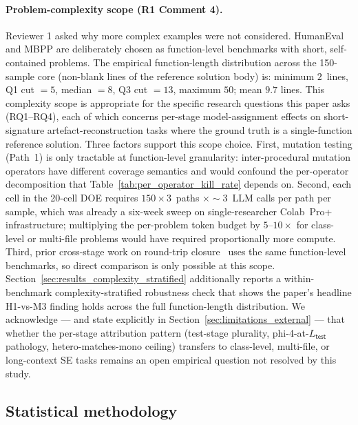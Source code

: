 \paragraph{Problem-complexity scope (R1 Comment 4).}
Reviewer 1 asked why more complex examples were not considered. HumanEval and MBPP are deliberately chosen as function-level benchmarks with short, self-contained problems. The empirical function-length distribution across the 150-sample core (non-blank lines of the reference solution body) is: minimum $2$~lines, Q1 cut $= 5$, median $= 8$, Q3 cut $= 13$, maximum $50$; mean $9.7$ lines. This complexity scope is appropriate for the specific research questions this paper asks (RQ1--RQ4), each of which concerns per-stage model-assignment effects on short-signature artefact-reconstruction tasks where the ground truth is a single-function reference solution. Three factors support this scope choice. First, mutation testing (Path~1) is only tractable at function-level granularity: inter-procedural mutation operators have different coverage semantics and would confound the per-operator decomposition that Table~\ref{tab:per_operator_kill_rate} depends on. Second, each cell in the 20-cell DOE requires $150 \times 3$~paths $\times \sim 3$~LLM calls per path per sample, which was already a six-week sweep on single-researcher Colab~Pro+ infrastructure; multiplying the per-problem token budget by $5$--$10\times$ for class-level or multi-file problems would have required proportionally more compute. Third, prior cross-stage work on round-trip closure~\citep{Allamanis2024RTC, Zhang2025CodingTriangle, Li2024MBCT} uses the same function-level benchmarks, so direct comparison is only possible at this scope. Section~\ref{sec:results_complexity_stratified} additionally reports a within-benchmark complexity-stratified robustness check that shows the paper's headline H1-vs-M3 finding holds across the full function-length distribution. We acknowledge --- and state explicitly in Section~\ref{sec:limitations_external} --- that whether the per-stage attribution pattern (test-stage plurality, phi-4-at-$L_{\textsf{test}}$ pathology, hetero-matches-mono ceiling) transfers to class-level, multi-file, or long-context SE tasks remains an open empirical question not resolved by this study.

\subsection{Statistical methodology}
\label{sec:experiment_setup_stats}

